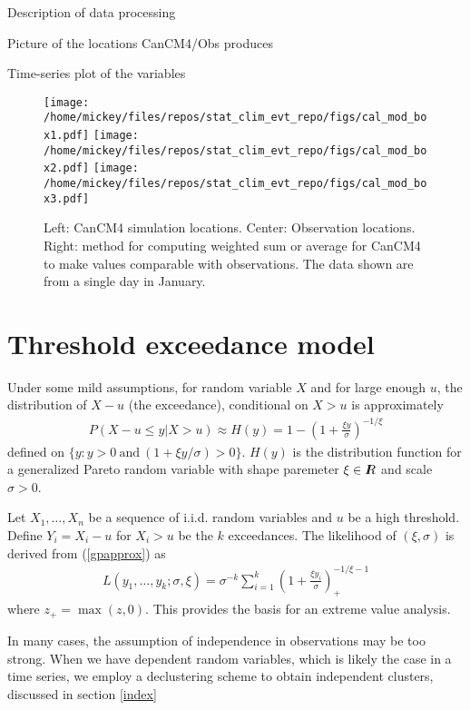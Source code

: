\documentclass[12pt]{article}
\newcommand{\R}{I\hspace{-4.4pt}R}
\newcommand{\R}{I\hspace{-4.4pt}R}
\begin{document}
Description of data processing
\bigskip

Picture of the locations CanCM4/Obs produces
\bigskip

Time-series plot of the variables
\bigskip

\begin{figure}
\begin{center}
\texttt{[image: /home/mickey/files/repos/stat\_clim\_evt\_repo/figs/cal\_mod\_box1.pdf]}
\texttt{[image: /home/mickey/files/repos/stat\_clim\_evt\_repo/figs/cal\_mod\_box2.pdf]}
\texttt{[image: /home/mickey/files/repos/stat\_clim\_evt\_repo/figs/cal\_mod\_box3.pdf]}
\end{center}
\caption{Left: CanCM4 simulation locations. Center: Observation locations. Right: method for computing weighted sum or average for CanCM4 to make values comparable with observations. The data shown are from a single day in January.}
\end{figure}
 
\section{Threshold exceedance model}
\label{thresh}

Under some mild assumptions, for random variable $X$ and for large enough $u$, the distribution of $X-u$ (the exceedance), conditional on $X>u$ is approximately
\begin{align}
P(X-u\leq y|X>u) \approx H(y) = 1 - \left(1+\frac{\xi y}{\sigma}\right)^{-1/\xi} \label{gpapprox}
\end{align}
defined on $\{y:y>0~\mathrm{and}~(1+\xi y/\sigma) >0\}$. $H(y)$ is the distribution function for a generalized Pareto random variable with shape paremeter $\xi\in\R$ and scale $\sigma>0$.

Let $X_1,\ldots,X_n$ be a sequence of i.i.d. random variables and $u$ be a high threshold. Define $Y_i=X_i-u$ for $X_i>u$ be the $k$ exceedances. The likelihood of $(\xi,\sigma)$ is derived from (\ref{gpapprox}) as
\begin{align}
L(y_1,\ldots,y_k;\sigma,\xi)=\sigma^{-k}\sum_{i=1}^k\left(1+\frac{\xi y_i}{\sigma}\right)_+^{-1/\xi-1} \label{gplike}
\end{align}
where $z_+=\max(z,0)$. This provides the basis for an extreme value analysis.

In many cases, the assumption of independence in observations may be too strong. When we have dependent random variables, which is likely the case in a time series, we employ a declustering scheme to obtain independent clusters, discussed in section \ref{index}
\bigskip
\end{document}
